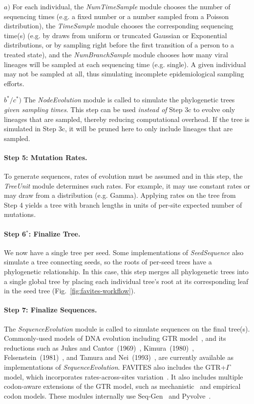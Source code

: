 $a)$ For each individual, the \textit{NumTimeSample} module chooses the number of sequencing times (e.g. a fixed number or a number sampled from a Poisson distribution), the \textit{TimeSample} module chooses the corresponding sequencing time(s) (e.g. by draws from uniform or truncated Gaussian or Exponential distributions, or by sampling right before the first transition of a person to a treated state), and the \textit{NumBranchSample} module chooses how many viral lineages will be sampled at each sequencing time (e.g. single). A given individual may not be sampled at all, thus simulating incomplete epidemiological sampling efforts.

$b^*/c^*)$ The \textit{NodeEvolution} module is called to simulate the phylogenetic trees \textit{given sampling times}. 
This step can be used \textit{instead of} Step 3c to evolve only lineages that are sampled, thereby reducing computational overhead.
If the tree is simulated in Step 3c, it will be pruned here to only include lineages that are sampled.

\paragraph{Step 5: Mutation Rates.} To generate sequences, rates of evolution must be assumed and in this step, the \textit{TreeUnit} module determines such rates. For example, it may use constant rates or may draw from a distribution (e.g. Gamma). Applying rates on the tree from Step 4 yields a tree with branch lengths in units of per-site expected number of mutations.

\paragraph{Step 6$^*$: Finalize Tree.} We now have a single tree per seed. Some implementations of \textit{SeedSequence} also simulate a tree connecting seeds, so the roots of per-seed trees have a phylogenetic relationship. In this case,  this step merges all phylogenetic trees into a single global tree by placing each individual tree's root at its corresponding leaf in the seed tree (Fig.~\ref{fig:favites-workflow}).

\paragraph{Step 7: Finalize Sequences.} The \textit{SequenceEvolution} module is called to simulate sequences on the final tree(s). Commonly-used models of DNA evolution including \gls{GTR} model~\cite{Tavare1986}, and its reductions such as Jukes and Cantor~(1969)~\cite{Jukes1969}, Kimura~(1980)~\cite{Kimura1980}, Felsenstein~(1981)~\cite{Felsenstein1981}, and Tamura and Nei~(1993)~\cite{Tamura1993}, are currently available as implementations of \textit{SequenceEvolution}. FAVITES also includes the \gls{GTR}+$\Gamma$ model, which incorporates rates-across-sites variation~\cite{Yang1994}. It also includes multiple codon-aware extensions of the \gls{GTR} model, such as mechanistic~\cite{Zaheri2014} and empirical~\cite{Kosiol2007} codon models. These modules internally use Seq-Gen~\cite{Rambaut1997} and Pyvolve~\cite{Spielman2015}.

